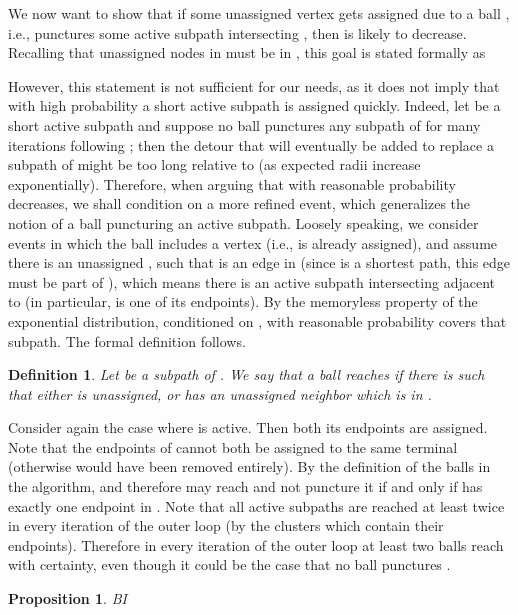 \documentclass[twoside,leqno,twocolumn]{article}
\newtheorem{definition}[Definition]{Definition}
\newtheorem{definition}[theorem]{Definition}
\newtheorem{proposition}[theorem]{Proposition}
\begin{document}
We now want to show that if some unassigned vertex  gets assigned due to a ball , i.e.,  punctures some active subpath intersecting , then  is likely to decrease. 
Recalling that unassigned nodes in  must be in , 
this goal is stated formally as 
 
However, this statement is not sufficient for our needs, as it does not imply 
that with high probability a short active subpath is assigned quickly. 
Indeed, let  be a short active subpath and suppose no ball punctures any subpath of  for many iterations following ; 
then the detour that will eventually be added to replace a subpath of 
might be too long relative to  (as expected radii increase exponentially). Therefore, when arguing that with reasonable probability  decreases,
we shall condition on a more refined event, 
which generalizes the notion of a ball puncturing an active subpath.
Loosely speaking, we consider events in which the ball  includes 
a vertex  (i.e.,  is already assigned),
and assume there is an unassigned , such that  is an edge in  (since  is a shortest path, this edge  must be part of ),
which means there is an active subpath intersecting  adjacent to 
(in particular,  is one of its endpoints). 
By the memoryless property of the exponential distribution, conditioned on , with reasonable probability  covers that subpath. 
The formal definition follows.

\begin{definition}
Let  be a subpath of . We say that a ball  {\em reaches}  if there is  such that either  is unassigned, 
or  has an unassigned neighbor which is in .
\end{definition}

Consider again the case where  is active. Then both its endpoints are assigned. Note that the endpoints of  cannot both be assigned to the same terminal (otherwise  would have been removed entirely). 
By the definition of the balls in the algorithm,  and therefore  may reach  and not puncture it if and only if  has exactly one endpoint in . Note that all active subpaths are reached at least twice in every iteration of the outer loop (by the clusters which contain their endpoints). Therefore in every iteration of the outer loop at least two balls reach  with certainty, even though it could be the case that no ball punctures . 
\begin{proposition} \label{p:cond}
BI
\end{proposition} 
\end{document}
